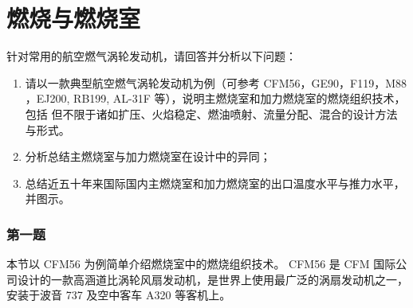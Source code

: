
\part{燃烧与燃烧室}

\begin{tcolorbox}
    针对常用的航空燃气涡轮发动机，请回答并分析以下问题：
    \begin{enumerate}
        \item 请以一款典型航空燃气涡轮发动机为例（可参考 CFM56，GE90，F119，M88
        ，EJ200, RB199, AL-31F 等），说明主燃烧室和加力燃烧室的燃烧组织技术，包括
        但不限于诸如扩压、火焰稳定、燃油喷射、流量分配、混合的设计方法与形式。
        \item 分析总结主燃烧室与加力燃烧室在设计中的异同；
        \item 总结近五十年来国际国内主燃烧室和加力燃烧室的出口温度水平与推力水平，
        并图示。
    \end{enumerate}
\end{tcolorbox}

\section{第一题}

本节以 CFM56 为例简单介绍燃烧室中的燃烧组织技术。
CFM56 是 CFM 国际公司设计的一款高涵道比涡轮风扇发动机，是世界上使用最广泛的涡扇发动机之一，安装于波音 737 及空中客车 A320 等客机上。

